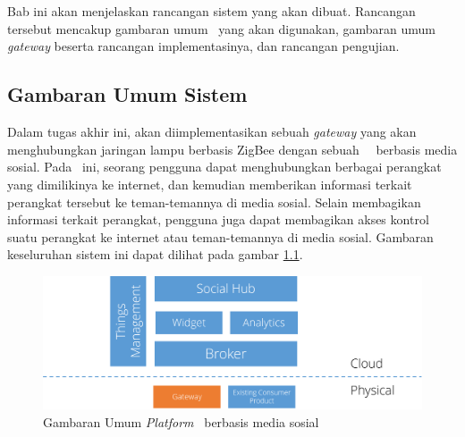 \chapter{\babTiga}
Bab ini akan menjelaskan rancangan sistem yang akan dibuat. Rancangan tersebut mencakup gambaran umum \plat~yang akan digunakan, gambaran umum \textit{gateway} beserta rancangan implementasinya, dan rancangan pengujian.

\section{Gambaran Umum Sistem}
Dalam tugas akhir ini, akan diimplementasikan sebuah \textit{gateway} yang akan menghubungkan jaringan lampu berbasis ZigBee dengan sebuah \plat~\iot~berbasis media sosial. Pada \plat~ini, seorang pengguna dapat menghubungkan berbagai perangkat  yang dimilikinya ke internet, dan kemudian memberikan informasi terkait perangkat tersebut ke teman-temannya di media sosial. Selain membagikan informasi terkait perangkat, pengguna juga dapat membagikan akses kontrol suatu perangkat ke internet atau teman-temannya di media sosial. Gambaran keseluruhan sistem ini dapat dilihat pada gambar \ref{fig:rancangan-siot}.

\begin{figure}
	\centering
	\includegraphics[width=.9\textwidth]{pics/rancangan-siot.PNG}
	\caption{Gambaran Umum \textit{Platform} \IOT~berbasis media sosial}
	\label{fig:rancangan-siot}
\end{figure}

